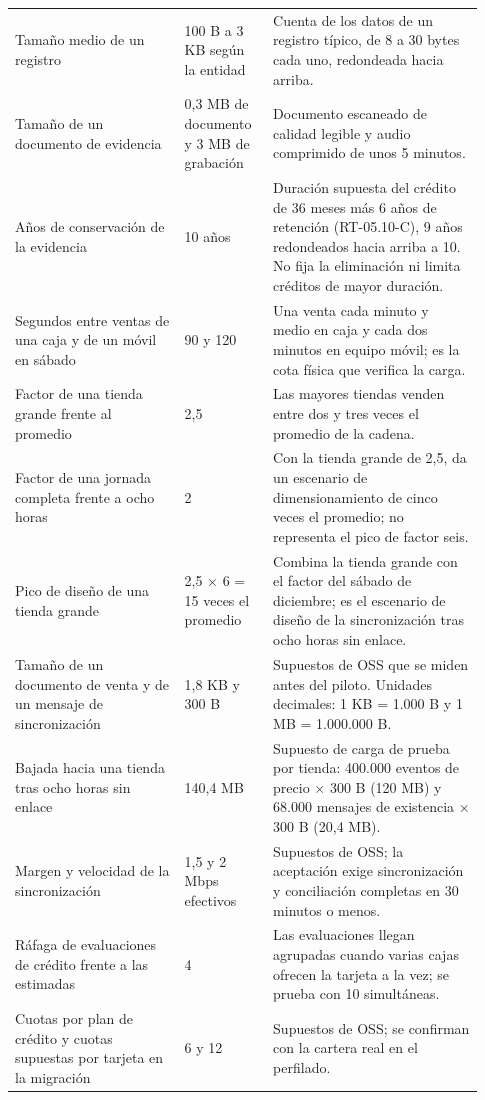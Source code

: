 \documentclass[11pt]{article}
\begin{document}
\begin{longtable}{@{}p{0.331\linewidth}p{0.176\linewidth}p{0.419\linewidth}@{}}
Tamaño medio de un registro & 100 B a 3 KB según la entidad & Cuenta de los datos de un registro típico, de 8 a 30 bytes cada uno, redondeada hacia arriba. \\
Tamaño de un documento de evidencia & 0,3 MB de documento y 3 MB de grabación & Documento escaneado de calidad legible y audio comprimido de unos 5 minutos. \\
Años de conservación de la evidencia & 10 años & Duración supuesta del crédito de 36 meses más 6 años de retención (RT-05.10-C), 9 años redondeados hacia arriba a 10. No fija la eliminación ni limita créditos de mayor duración. \\
Segundos entre ventas de una caja y de un móvil en sábado & 90 y 120 & Una venta cada minuto y medio en caja y cada dos minutos en equipo móvil; es la cota física que verifica la carga. \\
Factor de una tienda grande frente al promedio & 2,5 & Las mayores tiendas venden entre dos y tres veces el promedio de la cadena. \\
Factor de una jornada completa frente a ocho horas & 2 & Con la tienda grande de 2,5, da un escenario de dimensionamiento de cinco veces el promedio; no representa el pico de factor seis. \\
Pico de diseño de una tienda grande & 2,5 × 6 = 15 veces el promedio & Combina la tienda grande con el factor del sábado de diciembre; es el escenario de diseño de la sincronización tras ocho horas sin enlace. \\
Tamaño de un documento de venta y de un mensaje de sincronización & 1,8 KB y 300 B & Supuestos de OSS que se miden antes del piloto. Unidades decimales: 1 KB = 1.000 B y 1 MB = 1.000.000 B. \\
Bajada hacia una tienda tras ocho horas sin enlace & 140,4 MB & Supuesto de carga de prueba por tienda: 400.000 eventos de precio × 300 B (120 MB) y 68.000 mensajes de existencia × 300 B (20,4 MB). \\
Margen y velocidad de la sincronización & 1,5 y 2 Mbps efectivos & Supuestos de OSS; la aceptación exige sincronización y conciliación completas en 30 minutos o menos. \\
Ráfaga de evaluaciones de crédito frente a las estimadas & 4 & Las evaluaciones llegan agrupadas cuando varias cajas ofrecen la tarjeta a la vez; se prueba con 10 simultáneas. \\
Cuotas por plan de crédito y cuotas supuestas por tarjeta en la migración & 6 y 12 & Supuestos de OSS; se confirman con la cartera real en el perfilado. \\

\end{longtable}
\end{document}
